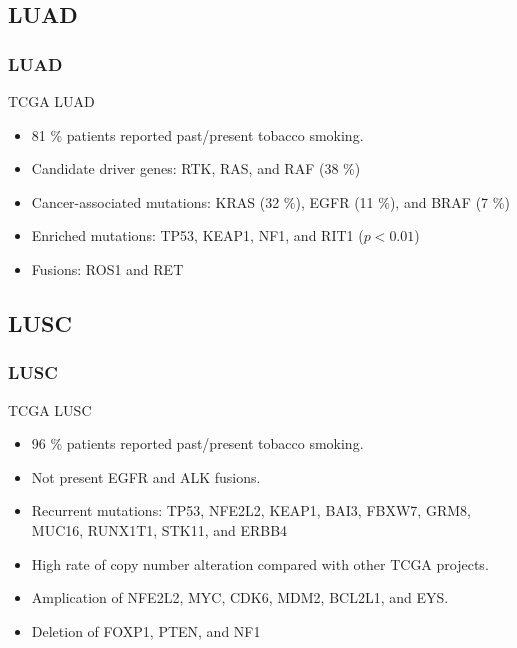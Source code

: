 \documentclass{beamer}
\begin{document}
    \subsection{LUAD}
    \begin{frame}
        \frametitle{LUAD}

        TCGA LUAD \cite{LUAD-1}
        \begin{itemize}
            \item 81 \% patients reported past/present tobacco smoking.
            \item Candidate driver genes: RTK, RAS, and RAF (38 \%)
            \item Cancer-associated mutations: KRAS (32 \%), EGFR (11 \%), and BRAF (7 \%)
            \item Enriched mutations: TP53, KEAP1, NF1, and RIT1 ($p < 0.01$)
            \item Fusions: ROS1 and RET
        \end{itemize}
    \end{frame}

    \subsection{LUSC}
    \begin{frame}
        \frametitle{LUSC}

        TCGA LUSC \cite{LUSC-1}
        \begin{itemize}
            \item 96 \% patients reported past/present tobacco smoking.
            \item Not present EGFR and ALK fusions.
            \item Recurrent mutations: TP53, NFE2L2, KEAP1, BAI3, FBXW7, GRM8, MUC16, RUNX1T1, STK11, and ERBB4
            \item High rate of copy number alteration compared with other TCGA projects.
            \item Amplication of NFE2L2, MYC, CDK6, MDM2, BCL2L1, and EYS.
            \item Deletion of FOXP1, PTEN, and NF1
        \end{itemize}
    \end{frame}
\end{document}
